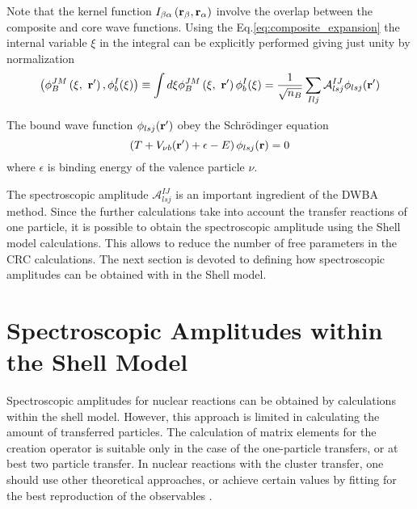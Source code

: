 \documentclass[
12pt, %
oneside, %
english, %
doublespacing, %
doublespacing, %
toctotoc, %
parskip, %
headsepline, %
]{MastersDoctoralThesis} %
\begin{document}
Note that the kernel function $I_{\beta \alpha}   \left( {\bf r}_\beta ,  {\bf r}_\alpha \right)  $ involve the overlap between the composite and core wave functions. 
Using the Eq.\ref{eq:composite_expansion} the internal variable $\xi$ in the integral can be explicitly performed giving just unity by normalization
\begin{equation}
\left( \phi^{JM}_B \left( \xi,~{\bf r}' \right), \phi_b^I ( \xi ) \right)
\equiv 
\int d \xi \phi^{JM}_B \left( \xi,~{\bf r}' \right)  \phi_b^I ( \xi ) = 
\frac{1}{\sqrt{n_B}}
 \sum_{Ilj} \mathcal{A}_{lsj}^{IJ}  \phi_{lsj} ({\bf r}')
\end{equation}
 
 The bound wave function $ \phi_{lsj} ({\bf r}')$ obey the Schr\"{o}dinger equation 
 \begin{equation}
 \left( T + V_{\nu b} ({\bf r}') + \epsilon - E \right) \phi_{lsj} ({\bf r}) = 0
 \end{equation}
 where $\epsilon$ is binding energy of the valence particle $\nu$.
 
 The spectroscopic amplitude $\mathcal{A}_{lsj}^{IJ}$ is an important ingredient of the DWBA method. Since the further calculations take into account the transfer reactions of one particle, it is possible to obtain the spectroscopic amplitude using the Shell model calculations. This allows to reduce the number of free parameters in the CRC calculations. The next section is devoted to defining how spectroscopic amplitudes can be obtained with in the Shell model.
 
 
\section{Spectroscopic Amplitudes within the Shell Model}
Spectroscopic amplitudes for nuclear reactions can be obtained by calculations within the shell model. However, this approach is limited in calculating the amount of transferred particles. The calculation of matrix elements for the creation operator is suitable only in the case of the one-particle transfers, or at best two particle transfer. In nuclear reactions with the cluster transfer, one should use other theoretical approaches, or achieve certain values by fitting for the best reproduction of the observables \cite{brown2017}.
\end{document}
